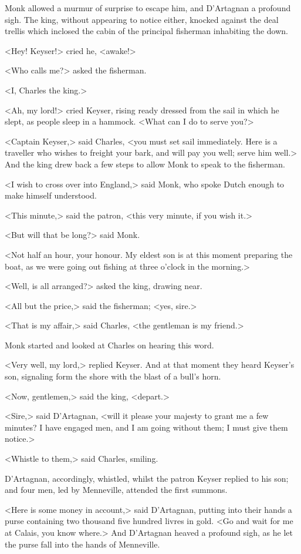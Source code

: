Monk allowed a murmur of surprise to escape him, and D'Artagnan a profound sigh. The king, without appearing to notice either, knocked against the deal trellis which inclosed the cabin of the principal fisherman inhabiting the down.

<Hey! Keyser!> cried he, <awake!>

<Who calls me?> asked the fisherman.

<I, Charles the king.>

<Ah, my lord!> cried Keyser, rising ready dressed from the sail in which he slept, as people sleep in a hammock. <What can I do to serve you?>

<Captain Keyser,> said Charles, <you must set sail immediately. Here is a traveller who wishes to freight your bark, and will pay you well; serve him well.> And the king drew back a few steps to allow Monk to speak to the fisherman.

<I wish to cross over into England,> said Monk, who spoke Dutch enough to make himself understood.

<This minute,> said the patron, <this very minute, if you wish it.>

<But will that be long?> said Monk.

<Not half an hour, your honour. My eldest son is at this moment preparing the boat, as we were going out fishing at three o'clock in the morning.>

<Well, is all arranged?> asked the king, drawing near.

<All but the price,> said the fisherman; <yes, sire.>

<That is my affair,> said Charles, <the gentleman is my friend.>

Monk started and looked at Charles on hearing this word.

<Very well, my lord,> replied Keyser. And at that moment they heard Keyser's son, signaling form the shore with the blast of a bull's horn.

<Now, gentlemen,> said the king, <depart.>

<Sire,> said D'Artagnan, <will it please your majesty to grant me a few minutes? I have engaged men, and I am going without them; I must give them notice.>

<Whistle to them,> said Charles, smiling.

D'Artagnan, accordingly, whistled, whilst the patron Keyser replied to his son; and four men, led by Menneville, attended the first summons.

<Here is some money in account,> said D'Artagnan, putting into their hands a purse containing two thousand five hundred livres in gold. <Go and wait for me at Calais, you know where.> And D'Artagnan heaved a profound sigh, as he let the purse fall into the hands of Menneville.

